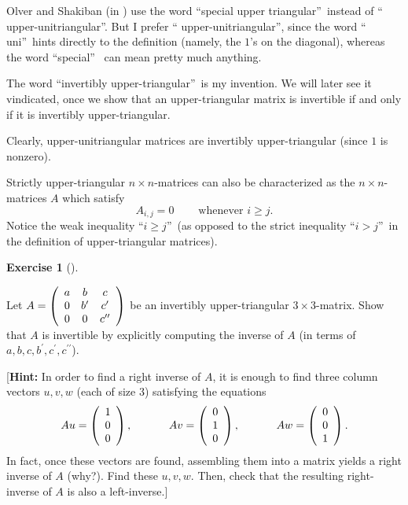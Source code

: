 \documentclass[numbers=enddot,12pt,final,onecolumn,notitlepage]{scrartcl}%
\theoremstyle{definition}
\newtheorem{exmp}[theo]{Exercise}
\newenvironment{exercise}[1][]
{\begin{exmp}[#1]\begin{leftbar}}
{\end{leftbar}\end{exmp}}
\begin{document}
Olver and Shakiban (in \cite{OlvSha06}) use the word \textquotedblleft special
upper triangular\textquotedblright\ instead of \textquotedblleft
upper-unitriangular\textquotedblright. But I prefer \textquotedblleft
upper-unitriangular\textquotedblright, since the word \textquotedblleft
uni\textquotedblright\ hints directly to the definition (namely, the $1$'s on
the diagonal), whereas the word \textquotedblleft special\textquotedblright%
\ can mean pretty much anything.

The word \textquotedblleft invertibly upper-triangular\textquotedblright\ is
my invention. We will later see it vindicated, once we show that an
upper-triangular matrix is invertible if and only if it is invertibly upper-triangular.

Clearly, upper-unitriangular matrices are invertibly upper-triangular (since
$1$ is nonzero).

Strictly upper-triangular $n\times n$-matrices can also be characterized as
the $n\times n$-matrices $A$ which satisfy%
\[
A_{i,j}=0\ \ \ \ \ \ \ \ \ \ \text{whenever }i\geq j.
\]
Notice the weak inequality \textquotedblleft$i\geq j$\textquotedblright\ (as
opposed to the strict inequality \textquotedblleft$i>j$\textquotedblright\ in
the definition of upper-triangular matrices).

\begin{exercise}
\label{exe.inverses.3x3-ut}Let $A=\left(
\begin{array}
[c]{ccc}%
a & b & c\\
0 & b^{\prime} & c^{\prime}\\
0 & 0 & c^{\prime\prime}%
\end{array}
\right)  $ be an invertibly upper-triangular $3\times3$-matrix. Show that $A$
is invertible by explicitly computing the inverse of $A$ (in terms of
$a,b,c,b^{\prime},c^{\prime},c^{\prime\prime}$).

[\textbf{Hint:} In order to find a right inverse of $A$, it is enough to find
three column vectors $u,v,w$ (each of size $3$) satisfying the equations%
\[
Au=\left(
\begin{array}
[c]{c}%
1\\
0\\
0
\end{array}
\right)  ,\ \ \ \ \ \ \ \ \ \ Av=\left(
\begin{array}
[c]{c}%
0\\
1\\
0
\end{array}
\right)  ,\ \ \ \ \ \ \ \ \ \ Aw=\left(
\begin{array}
[c]{c}%
0\\
0\\
1
\end{array}
\right)  .
\]
In fact, once these vectors are found, assembling them into a matrix yields a
right inverse of $A$ (why?). Find these $u,v,w$. Then, check that the
resulting right-inverse of $A$ is also a left-inverse.]
\end{exercise}
\end{document}
